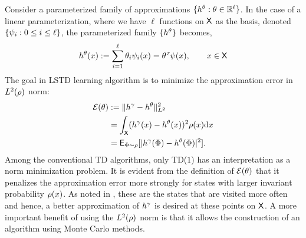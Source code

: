 Consider a parameterized family of approximations $\{h^\theta : \theta \in \mathbb{R}^\ell\}$. In the case of a linear parameterization, where we have $\ell$ functions on ${\sf X}$ as the basis, denoted $\{\psi_i : 0 \leq i \leq \ell\}$, the parameterized family $\{h^\theta\}$ becomes,
\begin{equation}
h^\param(x) := \sum_{i=1}^\ell \param_i \basis_i(x) = \param^\transpose \basis(x), \qquad x \in \state
\label{e:diff_td_linear_param}
\end{equation}
The goal in LSTD learning algorithm is to minimize the approximation error in $L^2(\rho)$ norm:
\begin{equation}
\begin{aligned}
\error(\param) &:=  \| h^\discount - h^\param \|^2_{L^2} \\
& = \int_\state (h^\discount(x) - h^\param(x))^2 \pr(x) \ud x \\
& = \Expect_{\markovstate \sim \pr} [|h^\discount(\markovstate) - h^\param(\markovstate)|^2].
\label{e:diff_td_h_norm_error}
\end{aligned}
\end{equation}
Among the conventional TD algorithms, only TD($1$) has an interpretation as a norm minimization problem. It is evident from the definition of $\mathcal{E}(\theta)$ that it penalizes the approximation error more strongly for states with larger invariant probability $\rho(x)$. As noted in \cite{ctcn}, these are the states that are visited more often and hence, a better approximation of $h^\gamma$ is desired at these points on ${\sf X}$. A more important benefit of using the $L^2(\rho)$ norm is that it allows the construction of an algorithm using Monte Carlo methods. 

